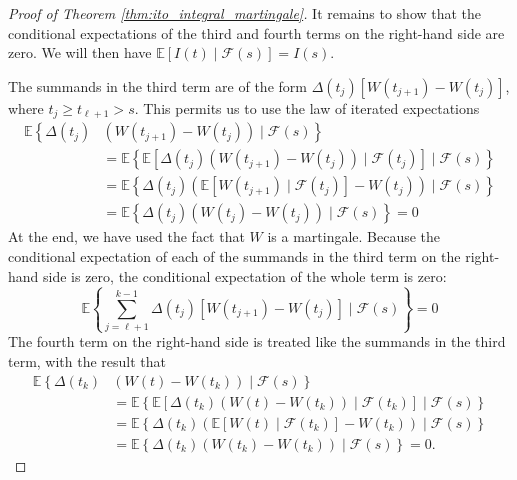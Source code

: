 \documentclass[\topdir/lecture\_notes.tex]{subfiles}
\begin{document}
\begin{optional}
\begin{proof}[Proof of Theorem \ref{thm:ito_integral_martingale}]
It remains to show that the conditional expectations of the third and fourth terms on the right-hand side are zero. We will then have $\mathbb{E}[I(t) \mid \mathcal{F}(s)]=I(s)$.

The summands in the third term are of the form $\Delta\left(t_{j}\right)\left[W\left(t_{j+1}\right)-W\left(t_{j}\right)\right]$, where $t_{j} \geq t_{\ell+1}>s$. This permits us to use the law of iterated expectations
\begin{align*}
\mathbb{E}\left\{\Delta\left(t_{j}\right)\right. & \left.\left(W\left(t_{j+1}\right)-W\left(t_{j}\right)\right) \mid \mathcal{F}(s)\right\} \\
& =\mathbb{E}\left\{\mathbb{E}\left[\Delta\left(t_{j}\right)\left(W\left(t_{j+1}\right)-W\left(t_{j}\right)\right) \mid \mathcal{F}\left(t_{j}\right)\right] \mid \mathcal{F}(s)\right\} \\
& =\mathbb{E}\left\{\Delta\left(t_{j}\right)\left(\mathbb{E}\left[W\left(t_{j+1}\right) \mid \mathcal{F}\left(t_{j}\right)\right]-W\left(t_{j}\right)\right) \mid \mathcal{F}(s)\right\} \\
& =\mathbb{E}\left\{\Delta\left(t_{j}\right)\left(W\left(t_{j}\right)-W\left(t_{j}\right)\right) \mid \mathcal{F}(s)\right\}=0
\end{align*}
At the end, we have used the fact that $W$ is a martingale. Because the conditional expectation of each of the summands in the third term on the right-hand side is zero, the conditional expectation of the whole term is zero:
\begin{equation*}
\mathbb{E}\left\{\sum_{j=\ell+1}^{k-1} \Delta\left(t_{j}\right)\left[W\left(t_{j+1}\right)-W\left(t_{j}\right)\right] \mid \mathcal{F}(s)\right\}=0
\end{equation*}
The fourth term on the right-hand side is treated like the summands in the third term, with the result that
\begin{align*}
\mathbb{E}\left\{\Delta\left(t_{k}\right)\right. & \left.\left(W(t)-W\left(t_{k}\right)\right) \mid \mathcal{F}(s)\right\} \\
& =\mathbb{E}\left\{\mathbb{E}\left[\Delta\left(t_{k}\right)\left(W(t)-W\left(t_{k}\right)\right) \mid \mathcal{F}\left(t_{k}\right)\right] \mid \mathcal{F}(s)\right\} \\
& =\mathbb{E}\left\{\Delta\left(t_{k}\right)\left(\mathbb{E}\left[W(t) \mid \mathcal{F}\left(t_{k}\right)\right]-W\left(t_{k}\right)\right) \mid \mathcal{F}(s)\right\} \\
& =\mathbb{E}\left\{\Delta\left(t_{k}\right)\left(W\left(t_{k}\right)-W\left(t_{k}\right)\right) \mid \mathcal{F}(s)\right\}=0 .
\end{align*}
\end{proof}


\end{optional}
\end{document}

